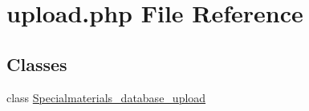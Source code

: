 \hypertarget{upload_8php}{\section{upload.\+php File Reference}
\label{upload_8php}
}
\subsection*{Classes}
\begin{DoxyCompactItemize}
\item 
class \hyperlink{classSpecialmaterials__database__upload}{Specialmaterials\+\_\+database\+\_\+upload}
\end{DoxyCompactItemize}
